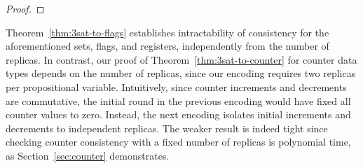 \begin{proof}

\end{proof}

Theorem~\ref{thm:3sat-to-flags} establishes intractability of consistency for the aforementioned sets, flags, and registers, independently from the number of replicas. In contrast, our proof of Theorem~\ref{thm:3sat-to-counter} for counter data types depends on the number of replicas, since our encoding requires two replicas per propositional variable. Intuitively, since counter increments and decrements are commutative, the initial round in the previous encoding would have fixed all counter values to zero. Instead, the next encoding isolates initial increments and decrements to independent replicas.
The weaker result is indeed tight since checking counter consistency with a fixed number of replicas is polynomial time, as Section~\ref{sec:counter} demonstrates.

